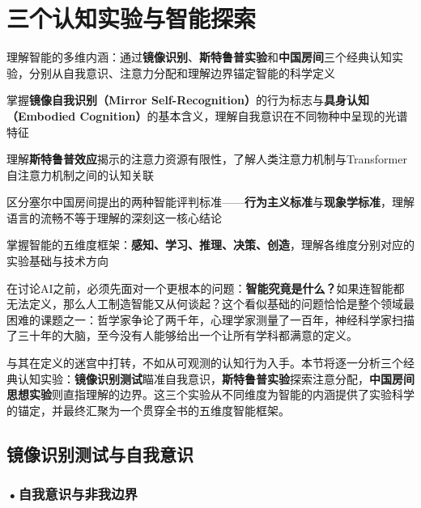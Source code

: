 \newpage

\section{三个认知实验与智能探索}

\begin{sectionkeypoints}
\item 理解智能的多维内涵：通过\textbf{镜像识别}、\textbf{斯特鲁普实验}和\textbf{中国房间}三个经典认知实验，分别从自我意识、注意力分配和理解边界锚定智能的科学定义
\item 掌握\textbf{镜像自我识别（Mirror Self-Recognition）}的行为标志与\textbf{具身认知（Embodied Cognition）}的基本含义，理解自我意识在不同物种中呈现的光谱特征
\item 理解\textbf{斯特鲁普效应}揭示的注意力资源有限性，了解人类注意力机制与Transformer自注意力机制之间的认知关联
\item 区分塞尔中国房间提出的两种智能评判标准——\textbf{行为主义标准}与\textbf{现象学标准}，理解语言的流畅不等于理解的深刻这一核心结论
\item 掌握智能的五维度框架：\textbf{感知、学习、推理、决策、创造}，理解各维度分别对应的实验基础与技术方向
\end{sectionkeypoints}

在讨论AI之前，必须先面对一个更根本的问题：\textbf{智能究竟是什么？}如果连智能都无法定义，那么人工制造智能又从何谈起？这个看似基础的问题恰恰是整个领域最困难的课题之一：哲学家争论了两千年，心理学家测量了一百年，神经科学家扫描了三十年的大脑，至今没有人能够给出一个让所有学科都满意的定义。

与其在定义的迷宫中打转，不如从可观测的认知行为入手。本节将逐一分析三个经典认知实验：\textbf{镜像识别测试}瞄准自我意识，\textbf{斯特鲁普实验}探索注意分配，\textbf{中国房间思想实验}则直指理解的边界。这三个实验从不同维度为智能的内涵提供了实验科学的锚定，并最终汇聚为一个贯穿全书的五维度智能框架。

\subsection{镜像识别测试与自我意识}

\subsubsection*{\textbf{•自我意识与非我边界}}

